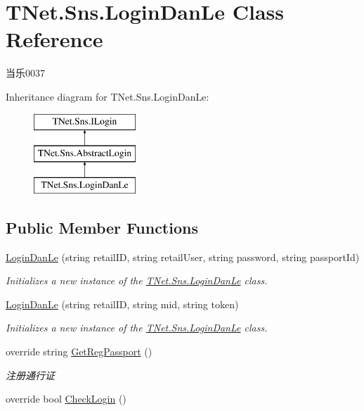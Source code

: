 \hypertarget{class_t_net_1_1_sns_1_1_login_dan_le}{}\section{T\+Net.\+Sns.\+Login\+Dan\+Le Class Reference}
\label{class_t_net_1_1_sns_1_1_login_dan_le}


当乐0037  


Inheritance diagram for T\+Net.\+Sns.\+Login\+Dan\+Le\+:\begin{figure}[H]
\begin{center}
\leavevmode
\includegraphics[height=3.000000cm]{class_t_net_1_1_sns_1_1_login_dan_le}
\end{center}
\end{figure}
\subsection*{Public Member Functions}
\begin{DoxyCompactItemize}
\item 
\mbox{\hyperlink{class_t_net_1_1_sns_1_1_login_dan_le_a425faaf41a0ab9ee7d872522f40d0842}{Login\+Dan\+Le}} (string retail\+ID, string retail\+User, string password, string passport\+Id)
\begin{DoxyCompactList}\small\item\em Initializes a new instance of the \mbox{\hyperlink{class_t_net_1_1_sns_1_1_login_dan_le}{T\+Net.\+Sns.\+Login\+Dan\+Le}} class. \end{DoxyCompactList}\item 
\mbox{\hyperlink{class_t_net_1_1_sns_1_1_login_dan_le_ac3fb220a52606af35c0e36bf5bddf6f1}{Login\+Dan\+Le}} (string retail\+ID, string mid, string token)
\begin{DoxyCompactList}\small\item\em Initializes a new instance of the \mbox{\hyperlink{class_t_net_1_1_sns_1_1_login_dan_le}{T\+Net.\+Sns.\+Login\+Dan\+Le}} class. \end{DoxyCompactList}\item 
override string \mbox{\hyperlink{class_t_net_1_1_sns_1_1_login_dan_le_a8f4d8299a72d87be61454902c240f2a2}{Get\+Reg\+Passport}} ()
\begin{DoxyCompactList}\small\item\em 注册通行证 \end{DoxyCompactList}\item 
override bool \mbox{\hyperlink{class_t_net_1_1_sns_1_1_login_dan_le_a1b2ba443fc79ee95c2f6db09f9ff5283}{Check\+Login}} ()
\end{DoxyCompactItemize}
